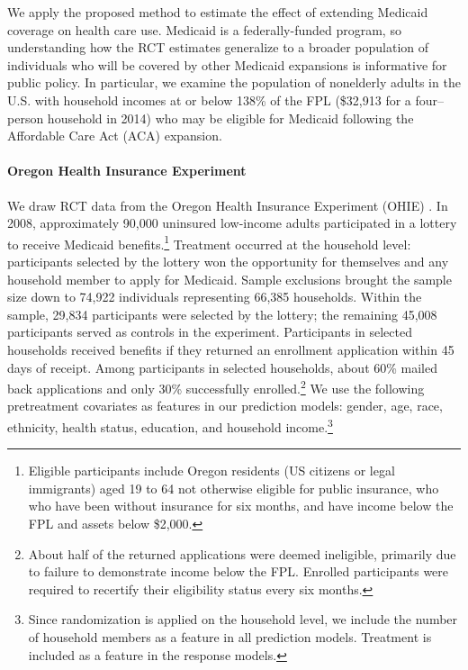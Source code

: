 \documentclass[12pt]{article}
\begin{document}
We apply the proposed method to estimate the effect of extending Medicaid coverage on health care use.  Medicaid is a federally-funded program, so understanding how the RCT estimates generalize to a broader population of individuals who will be covered by other Medicaid expansions is informative for public policy. In particular, we examine the population of nonelderly adults in the U.S. with household incomes at or below 138\% of the FPL (\$32,913 for a four--person household in 2014) who may be eligible for Medicaid following the Affordable Care Act (ACA) expansion.

\paragraph{Oregon Health Insurance Experiment}

We draw RCT data from the Oregon Health Insurance Experiment (OHIE) \cite{finkelstein2012,Taubman}.  In 2008, approximately 90,000 uninsured low-income adults participated in a lottery to receive Medicaid benefits.\footnote{Eligible participants include Oregon residents (US citizens or legal immigrants) aged 19 to 64 not otherwise eligible for public insurance, who who have been without insurance for six months, and have income below the FPL and assets below \$2,000.} Treatment occurred at the household level: participants selected by the lottery won the opportunity for themselves and any household member to apply for Medicaid. Sample exclusions brought the sample size down to 74,922 individuals representing 66,385 households.  Within the sample, 29,834 participants were selected by the lottery; the remaining 45,008 participants served as controls in the experiment.  Participants in selected households received benefits if they returned an enrollment application within 45 days of receipt. Among participants in selected households, about 60\% mailed back applications and only 30\% successfully enrolled.\footnote{About half of the returned applications were deemed ineligible, primarily due to failure to demonstrate income below the FPL. Enrolled participants were required to recertify their eligibility status every six months.} We use the following pretreatment covariates as features in our prediction models: gender, age, race, ethnicity, health status, education, and household income.\footnote{Since randomization is applied on the household level, we include the number of household members as a feature in all prediction models. Treatment is included as a feature in the response models.}  \\
\end{document}
